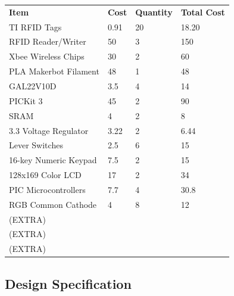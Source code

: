 \documentclass[12pt]{article} %
\begin{document}
\begin{table}[h]
	\begin{tabular}{llll}
		\textbf{Item}         & \textbf{Cost} & \textbf{Quantity} & \textbf{Total Cost} \\
		TI RFID Tags          & 0.91          & 20                & 18.20               \\
		RFID Reader/Writer    & 50            & 3                 & 150                 \\
		Xbee Wireless Chips   & 30            & 2                 & 60                  \\
		PLA Makerbot Filament & 48            & 1                 & 48                  \\
		GAL22V10D             & 3.5           & 4                 & 14                  \\
		PICKit 3              & 45            & 2                 & 90                  \\
		SRAM                  & 4             & 2                 & 8                   \\
		3.3 Voltage Regulator & 3.22          & 2                 & 6.44                \\
		Lever Switches        & 2.5           & 6                 & 15                  \\
		16-key Numeric Keypad & 7.5           & 2                 & 15                  \\
		128x169 Color LCD     & 17            & 2                 & 34                  \\
		PIC Microcontrollers  & 7.7           & 4                 & 30.8                \\
		RGB Common Cathode    & 4             & 8                 & 12                  \\
		(EXTRA)               &               &                   &                     \\
		(EXTRA)               &               &                   &                     \\
		(EXTRA)               &               &                   &                    
	\end{tabular}
\end{table}

\subsection{Design Specification\label{sec:designSpec}} 
\end{document}
